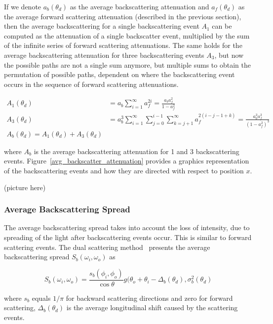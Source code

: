 If we denote $a_b(\theta_d)$ as the average backscattering attenuation and $a_f(\theta_d)$ as the average forward scattering attenuation (described in the previous section), then the average backscattering for a single backscattering event $A_1$ can be computed as the attenuation of a single backscatter event, multiplied by the sum of the infinite series of forward scattering attenuations. The same holds for the average backscattering attenuation for three backscattering events $A_3$, but now the possible paths are not a single sum anymore, but multiple sums to obtain the permutation of possible paths, dependent on where the backscattering event occurs in the sequence of forward scattering attenuations.

\begin{align}
A_1(\theta_d) &= a_b \sum_{i=1}^{\infty} a_f^{2i} = \frac{a_b a_f^2}{1 - a_f^2} \\
A_3(\theta_d) &= a_b^3 \sum_{i=1}^{\infty}  \sum_{j=0}^{i-1} \sum_{k=j+1}^{\infty} a_f^{2(i-j-1+k)} = \frac{a_b^3 a_f^2}{(1 - a_f^2)^3} \\
A_b(\theta_d) = A_1(\theta_d) + A_3(\theta_d)
\end{align}

where $A_b$ is the average backscattering attenuation for 1 and 3 backscattering events. Figure~\ref{avg_backscatter_attenuation} provides a graphics representation of the backscattering events and how they are directed with respect to position $x$.

(picture here)

\subsubsection{Average Backscattering Spread}

The average backscattering spread takes into account the loss of intensity, due to spreading of the light after backscattering events occur. This is similar to forward scattering events. The dual scattering method~\cite{zinke} presents the average backscattering spread $S_b(\omega_i, \omega_o)$ as

\begin{equation}
S_b(\omega_i, \omega_o) = \frac{s_b(\phi_i, \phi_o)}{\cos \theta} g(\theta_o + \theta_i - \Delta_b(\theta_d), \sigma_b^2(\theta_d)
\end{equation}

where $s_b$ equals $1/\pi$ for backward scattering directions and zero for forward scattering, $\Delta_b(\theta_d)$ is the average longitudinal shift caused by the scattering events.

